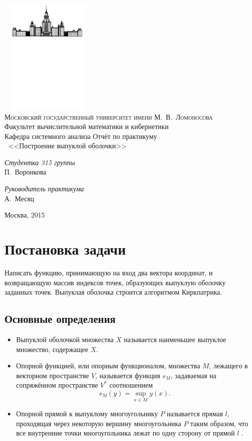 \documentclass[12pt]{article}
\begin{document}
\thispagestyle{empty}
\begin{center}
\ \vspace{-3cm}
\includegraphics[width=0.3\textwidth]{i1.pdf}\\
{\scshape Московский государственный университет имени М.~В.~Ломоносова}\\
Факультет вычислительной математики и кибернетики\\
Кафедра системного анализа
\vfill
{\LARGE Отчёт по практикуму\\}
\vspace{1cm}
{\Huge\textbf\ <<Построение выпуклой оболочки>>}
\end{center}
\vspace{1cm}
\begin{flushright}
\large
\textit{Студентка 315 группы}\\
П.~Воронкова

\vspace{10mm}
\textit{Руководитель практикума}\\
А.~Месяц
\end{flushright}
\vfill
\begin{center}
Москва, 2015
\end{center}
\newpage
\section {Постановка задачи}
\indent Написать функцию, принимающую на вход два вектора координат, и возвращающую массив индексов точек, образующих выпуклую оболочку заданных точек. Выпуклая оболочка строится алгоритмом Киркпатрика.
\subsection{Основные определения}
\begin {itemize}
\item Выпуклой оболочкой множества $X$ называется наименьшее выпуклое множество, содержащее $X$.
\item Опорной функцией, или опорным функционалом, множества $M$, лежащего в векторном пространстве $V$, называется функция $s_M$, задаваемая на сопряжённом пространстве $V^*$ соотношением 
$$s_M (y) = \sup_{x\in M} y(x).$$
\item Опорной прямой к выпуклому многоугольнику  $P$  называется прямая  $l$, проходящая через некоторую вершину многоугольника  $P$  таким образом, что все внутренние точки многоугольника лежат по одну сторону от прямой  $l$ .
\end{itemize}
\end{document}
